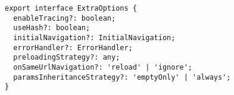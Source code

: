\begin{verbatim}
export interface ExtraOptions {
  enableTracing?: boolean;
  useHash?: boolean;
  initialNavigation?: InitialNavigation;
  errorHandler?: ErrorHandler;
  preloadingStrategy?: any;
  onSameUrlNavigation?: 'reload' | 'ignore';
  paramsInheritanceStrategy?: 'emptyOnly' | 'always';
}
\end{verbatim}
